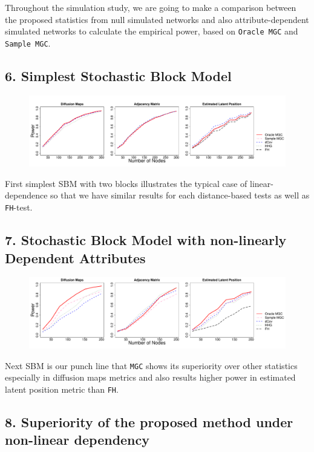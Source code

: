 \documentclass[12pt]{article}
\begin{document}
 Throughout the simulation study, we are going to make a comparison between the proposed statistics from null simulated networks and also attribute-dependent simulated networks to calculate the empirical power, based on \texttt{Oracle MGC} and \texttt{Sample MGC}.
 
 
\subsection*{6. Simplest Stochastic Block Model}
 
\begin{figure}[H]
	\centering
	\includegraphics[width=6in]{../Figure/twoSBM.pdf}
	\label{fig:twoSBM}
\end{figure}

First simplest SBM with two blocks illustrates the typical case of linear-dependence so that we have similar results for each distance-based tests as well as \texttt{FH}-test.


\subsection*{7. Stochastic Block Model with non-linearly Dependent Attributes}

\begin{figure}[H]
	\centering
	\includegraphics[width=6in]{../Figure/ThreeSBM.pdf}
	\label{fig:Three}
\end{figure}	

Next SBM is our punch line that \texttt{MGC} shows its superiority over other statistics especially in diffusion maps metrics and also results higher power in estimated latent position metric than \texttt{FH}.

\subsection*{8. Superiority of the proposed method under non-linear dependency}
\end{document}
